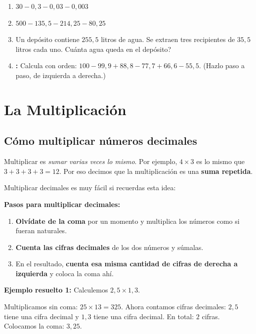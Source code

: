 \documentclass[12pt, letterpaper]{article}
\begin{document}
\begin{enumerate}[leftmargin=*, start=23]
  \item \dificil{} $30 - 0{,}3 - 0{,}03 - 0{,}003$

  \item \dificil{} $500 - 135{,}5 - 214{,}25 - 80{,}25$

  \item \dificil{} Un depósito contiene $255{,}5$ litros de agua. Se extraen tres recipientes de $35{,}5$ litros cada uno. \textquestiondown Cuánta agua queda en el depósito?

  \item \dificil{} \textbf{:} Calcula con orden: $100 - 99{,}9 + 88{,}8 - 77{,}7 + 66{,}6 - 55{,}5$. (Hazlo paso a paso, de izquierda a derecha.)
\end{enumerate}


\section{La Multiplicación}

\subsection{Cómo multiplicar números decimales}

Multiplicar es \emph{sumar varias veces lo mismo}. Por ejemplo, $4 \times 3$ es lo mismo que $3 + 3 + 3 + 3 = 12$. Por eso decimos que la multiplicación es una \textbf{suma repetida}.

Multiplicar decimales es muy fácil si recuerdas esta idea:

\begin{cuadropasos}
  \textbf{Pasos para multiplicar decimales:}
  \begin{enumerate}
    \item \textbf{Olvídate de la coma} por un momento y multiplica los números como si fueran naturales.
    \item \textbf{Cuenta las cifras decimales} de los dos números y súmalas.
    \item En el resultado, \textbf{cuenta esa misma cantidad de cifras de derecha a izquierda} y coloca la coma ahí.
  \end{enumerate}
\end{cuadropasos}

\noindent\textbf{Ejemplo resuelto 1:} Calculemos $2{,}5 \times 1{,}3$.

Multiplicamos sin coma: $25 \times 13 = 325$. Ahora contamos cifras decimales: $2{,}5$ tiene una cifra decimal y $1{,}3$ tiene una cifra decimal. En total: $2$ cifras. Colocamos la coma: $3{,}25$.
\end{document}

